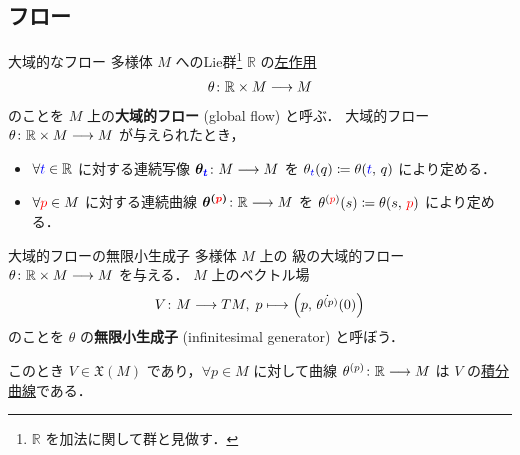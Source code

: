 \documentclass[TQFT_main]{subfiles}
\begin{document}
\subsection{フロー}

\begin{mydef}[label=def:global-flow]{大域的なフロー}
    \cinfty 多様体 $M$ へのLie群\footnote{$\mathbb{R}$ を加法に関して群と見做す．} $\mathbb{R}$ の\hyperref[def:Lie-action]{左作用}
    \begin{align}
        \theta \colon \mathbb{R} \times M \longrightarrow M
    \end{align}
    のことを $M$ 上の\textbf{大域的フロー} (global flow) と呼ぶ．
    \tcblower
    大域的フロー $\theta \colon \mathbb{R} \times M \longrightarrow M$ が与えられたとき，
    \begin{itemize}
        \item $\forall \textcolor{blue}{t} \in \mathbb{R}$ に対する連続写像 $\bm{\theta_{\textcolor{blue}{t}}} \colon M \longrightarrow M$ を $\theta_{\textcolor{blue}{t}}(q) \coloneqq \theta(\textcolor{blue}{t},\, q)$ により定める．
        \item $\forall \textcolor{red}{p} \in M$ に対する連続曲線 $\bm{\theta^{(\textcolor{red}{p})}} \colon \mathbb{R} \longrightarrow M$ を $\theta^{(\textcolor{red}{p})}(s) \coloneqq \theta(s,\, \textcolor{red}{p})$ により定める．
    \end{itemize}
\end{mydef}

\begin{myprop}[label=prop:infinitesimal-generator]{大域的フローの無限小生成子}
    \cinfty 多様体 $M$ 上の \cinfty 級の大域的フロー $\theta \colon \mathbb{R} \times M \longrightarrow M$ を与える．
    $M$ 上のベクトル場
    \begin{align}
        V \colon M \longrightarrow TM,\; p \longmapsto \left( p,\, \dot{\theta^{(p)}} (0)  \right) 
    \end{align}
    のことを $\theta$ の\textbf{無限小生成子} (infinitesimal generator) と呼ぼう．

    このとき $V \in \mathfrak{X}(M)$ であり，$\forall p \in M$ に対して\cinfty 曲線 $\theta^{(p)} \colon \mathbb{R} \longrightarrow M$ は $V$ の\hyperref[def:integral-curve]{積分曲線}である．
\end{myprop}
\end{document}
